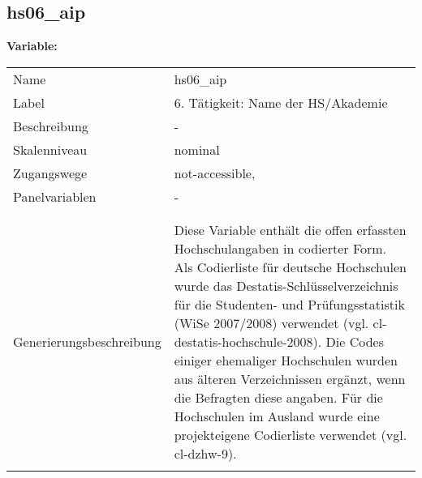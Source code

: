	
	
	\subsection{hs06\_aip}
	\label{subSection:hs06_aip}

	\noindent\textbf{Variable:}\\
		\begin{tabular}{lL{11.3cm}}
			\label{tableVariable:hs06_aip}
			Name & hs06\_aip \\
			Label & 6. Tätigkeit: Name der HS/Akademie \\
			Beschreibung & - \\
			Skalenniveau & nominal \\
			Zugangswege &
				not-accessible,
 \\
			Panelvariablen & -
			 \\
			 \\
 \\
					Generierungsbeschreibung & Diese Variable enthält die offen erfassten Hochschulangaben in codierter Form. Als Codierliste für deutsche Hochschulen wurde das Destatis-Schlüsselverzeichnis für die Studenten- und Prüfungsstatistik (WiSe 2007/2008) verwendet (vgl. cl-destatis-hochschule-2008). Die Codes einiger ehemaliger Hochschulen wurden aus älteren Verzeichnissen ergänzt, wenn die Befragten diese angaben. Für die Hochschulen  im Ausland wurde eine projekteigene Codierliste verwendet (vgl. cl-dzhw-9). 
				 \\	
			 \\
		\end{tabular}






	
	\newpage
